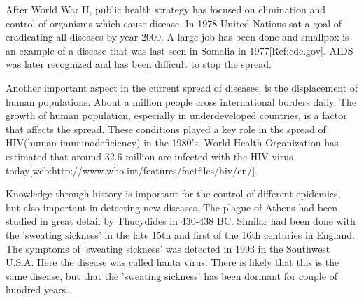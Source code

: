 \documentclass[%
twoside,                 %
final,                   %
10pt]{article}
\begin{document}
\vspace{3mm}


After World War II, public health strategy has focused on elimination and control of organisms which cause disease. In 1978 United Nations sat a goal of eradicating all diseases by year 2000. A large job has been done and smallpox is an example of a disease that was last seen in Somalia in 1977[Ref:cdc.gov]. AIDS was later recognized and has been difficult to stop the spread.


\vspace{3mm}




\vspace{3mm}


Another important aspect in the current spread of diseases, is the displacement of human populations. About a million people cross international borders daily. The growth of human population, especially in underdeveloped countries, is a factor that affects the spread. These conditions played a key role in the spread of HIV(human immunodeficiency) in the 1980's. World Health Organization has estimated that around 32.6 million are infected with the HIV virus today[web:http://www.who.int/features/factfiles/hiv/en/].


\vspace{3mm}




\vspace{3mm}


Knowledge through history is important for the control of different epidemics, but also important in detecting new diseases. The plague of Athens had been studied in great detail by Thucydides in 430-438 BC. Similar had been done with the 'sweating sickness' in the late 15th and first of the 16th centuries in England. The symptoms of 'sweating sickness' was detected in 1993 in the Southwest U.S.A. Here the disease was called hanta virus. There is likely that this is the same disease, but that the 'sweating sickness' has been dormant for couple of hundred years.\cite[p.~317]{murray2002mathematical}.~


\vspace{3mm}




\vspace{3mm}
\end{document}
